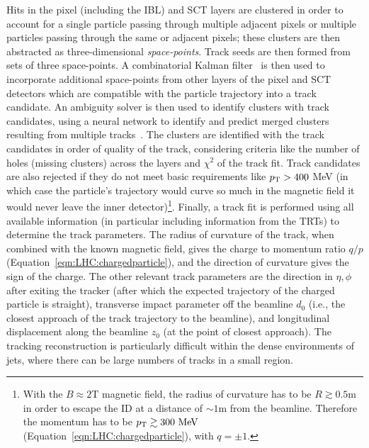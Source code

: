 Hits in the pixel (including the IBL) and SCT layers are clustered in order to account for a single particle passing through multiple adjacent pixels or multiple particles passing through the same or adjacent pixels; these clusters are then abstracted as three-dimensional \textit{space-points}.
Track seeds are then formed from sets of three space-points.
A combinatorial Kalman filter~\cite{Fruhwirth:1987fm} is then used to incorporate additional space-points from other layers of the pixel and SCT detectors which are compatible with the particle trajectory into a track candidate.
An ambiguity solver is then used to identify clusters with track candidates, using a neural network to identify and predict merged clusters resulting from multiple tracks~\cite{Aad:2014yva}.
The clusters are identified with the track candidates in order of quality of the track, considering criteria like the number of holes (missing clusters) across the layers and $\chi^2$ of the track fit.
Track candidates are also rejected if they do not meet basic requirements like $p_{\text{T}}>400$ MeV (in which case the particle's trajectory would curve so much in the magnetic field it would never leave the inner detector)\footnote{With the $B \approx 2\text{T}$ magnetic field, the radius of curvature has to be $R \gtrsim 0.5\text{m}$ in order to escape the ID at a distance of $\sim 1\text{m}$ from the beamline. Therefore the momentum has to be $p_{\text{T}} \gtrsim 300~\mathrm{MeV}$ (Equation~\ref{eqn:LHC:chargedparticle}), with $q=\pm 1$.}.
Finally, a track fit is performed using all available information (in particular including information from the TRTs) to determine the track parameters.
The radius of curvature of the track, when combined with the known magnetic field, gives the charge to momentum ratio $q/p$ (Equation~\ref{eqn:LHC:chargedparticle}), and the direction of curvature gives the sign of the charge.
The other relevant track parameters are the direction in $\eta,\phi$ after exiting the tracker (after which the expected trajectory of the charged particle is straight), transverse impact parameter off the beamline $d_0$ (i.e., the closest approach of the track trajectory to the beamline), and longitudinal displacement along the beamline $z_0$ (at the point of closest approach).
The tracking reconstruction is particularly difficult within the dense environments of jets, where there can be large numbers of tracks in a small region.

